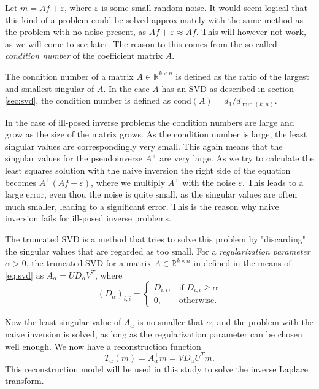 \documentclass[12pt,a4]{article}
\newcommand{\R}{{\mathbb R}}
\newcommand{\eps}{\varepsilon}
\newcommand{\cond}{\ensuremath{\text{cond}}}
\begin{document}
Let $m = A f + \eps$, where $\eps$ is some small random noise. It would seem logical that this kind of a problem could be solved approximately with the same method as the problem with no noise present, as $Af + \eps \approx Af$. This will however not work, as we will come to see later. The reason to this comes from the so called \emph{condition number} of the coefficient matrix $A$.

The condition number of a matrix $A \in \R^{k \times n}$ is defined as the ratio of the largest and smallest singular of $A$. In the case $A$ has an SVD as described in section \ref{sec:svd}, the condition number is defined as $\cond(A) = d_1 / d_{\min(k,n)}$.

In the case of ill-posed inverse problems the condition numbers are large and grow as the size of the matrix grows. As the condition number is large, the least singular values are correspondingly very small. This again means that the singular values for the pseudoinverse $A^+$ are very large. As we try to calculate the least squares solution with the naive inversion the right side of the equation becomes $A^+ (Af + \eps)$, where we multiply $A^+$ with the noise $\eps$. This leads to a large error, even thou the noise is quite small, as the singular values are often much smaller, leading to a significant error. This is the reason why naive inversion fails for ill-posed inverse problems.

The truncated SVD is a method that tries to solve this problem by "discarding" the singular values that are regarded as too small. For a \emph{regularization parameter} $\alpha > 0$, the truncated SVD for a matrix $A \in \R^{k \times n}$ in defined in the means of \eqref{eq:svd} as $A_{\alpha} = U D_{\alpha} V^T$, where
\begin{equation}
(D_{\alpha})_{i,i} =
\begin{cases}
D_{i,i}, & \text{if } D_{i,i} \geq \alpha \\
0,       & \text{otherwise}.
\end{cases}
\end{equation}

Now the least singular value of $A_{\alpha}$ is no smaller that $\alpha$, and the problem with the naive inversion is solved, as long as the regularization parameter can be chosen well enough. We now have a reconstruction function
\begin{equation}
T_{\alpha}(m) = A_{\alpha}^+ m = V D_{\alpha} U^T m.
\end{equation}
This reconstruction model will be used in this study to solve the inverse Laplace transform.
\end{document}
